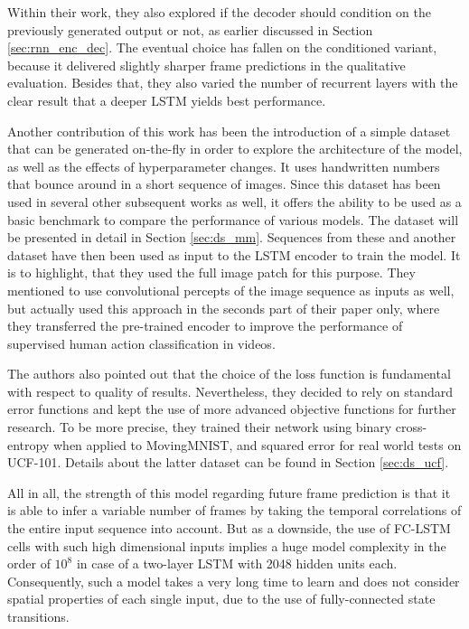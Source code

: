 Within their work, they also explored if the decoder should condition on the previously generated output or not, as earlier discussed in Section \ref{sec:rnn_enc_dec}. The eventual choice has fallen on the conditioned variant, because it delivered slightly sharper frame predictions in the qualitative evaluation. Besides that, they also varied the number of recurrent layers with the clear result that a deeper LSTM yields best performance.

Another contribution of this work has been the introduction of a simple dataset that can be generated on-the-fly in order to explore the architecture of the model, as well as the effects of hyperparameter changes. It uses handwritten numbers that bounce around in a short sequence of images. Since this dataset has been used in several other subsequent works as well, it offers the ability to be used as a basic benchmark to compare the performance of various models. The dataset will be presented in detail in Section \ref{sec:ds_mm}. Sequences from these and another dataset have then been used as input to the LSTM encoder to train the model. It is to highlight, that they used the full image patch for this purpose. They mentioned to use convolutional percepts of the image sequence as inputs as well, but actually used this approach in the seconds part of their paper only, where they transferred the pre-trained encoder to improve the performance of supervised human action classification in videos.

The authors also pointed out that the choice of the loss function is fundamental with respect to quality of results. Nevertheless, they decided to rely on standard error functions and kept the use of more advanced objective functions for further research. To be more precise, they trained their network using binary cross-entropy when applied to MovingMNIST, and squared error for real world tests on UCF-101. Details about the latter dataset can be found in Section \ref{sec:ds_ucf}.

All in all, the strength of this model regarding future frame prediction is that it is able to infer a variable number of frames by taking the temporal correlations of the entire input sequence into account. But as a downside, the use of FC-LSTM cells with such high dimensional inputs implies a huge model complexity in the order of $10^8$ in case of a two-layer LSTM with \num{2048} hidden units each. Consequently, such a model takes a very long time to learn and does not consider spatial properties of each single input, due to the use of fully-connected state transitions.


